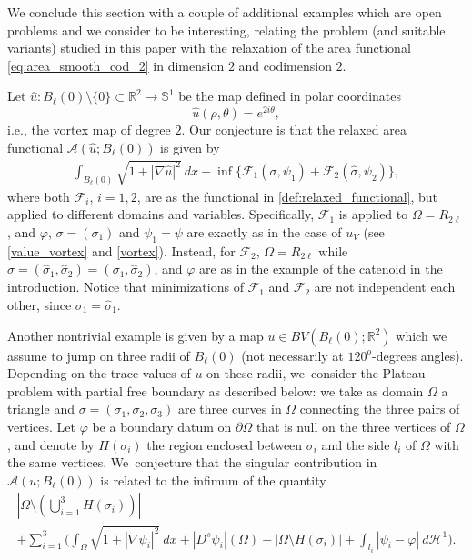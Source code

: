 \documentclass[11pt]{article}
\newcommand{\ie}{i.e.,\xspace}
\numberwithin{equation}{section}
\newcommand{\R}{\mathbb{R}}
\let\Om\Omega
\theoremstyle{definition}
\begin{document}
We conclude this section with a couple of additional
examples which are open problems and we consider to be interesting, relating the problem
(and suitable variants) studied in this paper with the relaxation
of the area functional \eqref{eq:area_smooth_cod_2}
in dimension $2$ and codimension $2$.

Let $\widehat u:B_\ell(0)\setminus\{0\}\subset\R^2\to \mathbb S^1$ be the map defined in polar coordinates
\[
\widehat u(\rho,\theta)=e^{2i\theta},
\]
\ie the vortex map of degree $2$. Our conjecture is
that the relaxed area functional $\mathcal A(\widehat u;B_\ell(0)) $ is given by
\begin{align}\label{value_vortex2}
\int_{B_\ell(0)}\sqrt{1+|\nabla \widehat u|^2}~dx+\inf\{\mathcal F_1(\sigma,\psi_1)+\mathcal F_2(\widehat \sigma,\psi_2)\},
\end{align}
where both $\mathcal F_i$, $i=1,2$, are as the functional in \eqref{def:relaxed_functional}, but applied to different domains and variables. Specifically, $\mathcal F_1$ is applied to $\Om=R_{2\ell}$, and $\varphi$, $\sigma=(\sigma_1)$ and $\psi_1=\psi$ are exactly as in the case of $u_V$ (see \eqref{value_vortex} and \eqref{vortex}). Instead, for $\mathcal F_2$, $\Om=R_{2\ell}$ while $\widehat \sigma=(\widehat \sigma_1,\widehat\sigma_2)=( \sigma_1,\widehat\sigma_2)$, and $\varphi$ are as in the example of the catenoid in the introduction. Notice that minimizations of $\mathcal F_1$ and $\mathcal F_2$ are not independent each other, since $\sigma_1=\widehat \sigma_1$.

Another nontrivial example is given by a map $u\in BV(B_\ell(0);\R^2)$ which we assume to jump on three radii of $ B_\ell(0)$ (not necessarily
at $120^o$-degrees angles). Depending on the trace values of $u$ on these radii, we~consider the Plateau problem with partial free boundary as described below: we take as domain $\Om$ a triangle and $\sigma=(\sigma_1,\sigma_2,\sigma_3)$ are three curves in $\Om$ connecting the three pairs of vertices. Let $\varphi$ be a boundary datum on $\partial \Om$ that is null on the three vertices of $\Om$, and denote by $H(\sigma_i)$ the region enclosed between $\sigma_i$ and the side $l_i$ of $\Om$ with the same vertices. We~conjecture that the singular contribution in $\mathcal A(u;B_\ell(0))$ is related to the infimum of the quantity
\begin{multline*}\textstyle
|\Om\setminus (\bigcup_{i=1}^3H(\sigma_i))|\\
+ \sum_{i=1}^3\biggl(\int_\Om\sqrt{1+|\nabla\psi_i|^2}~dx+|D^s\psi_i|(\Om)-|\Om\setminus H(\sigma_i)|+\int_{l_i}|\psi_i-\varphi|~d\mathcal H^1\biggr).
\end{multline*}
\end{document}
